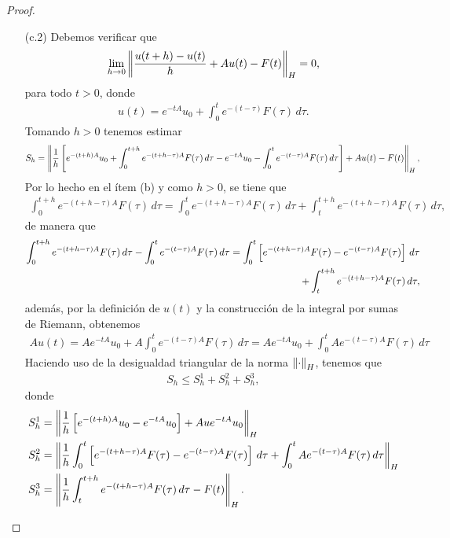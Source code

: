 \begin{proof}
\begin{enumerate}
    \item[(c.2)] Debemos verificar que
    \begin{align*}
        \lim_{h\to 0}\left\|\dfrac{u(t+h)-u(t)}{h}+Au(t)-F(t)\right\|_H=0,
    \end{align*}
    para todo $t>0$, donde
    \begin{align*}
        u(t)=e^{-tA}u_0+\int_0^t e^{-(t-\tau)}F(\tau)\, d\tau.
    \end{align*}
    Tomando $h>0$ tenemos estimar
    \begin{align*}
        S_h=\left\|\frac{1}{h}\left[e^{-(t+h)A}u_0+\int_0^{t+h}e^{-(t+h-\tau)A}F(\tau)\, d\tau-e^{-tA}u_0-\int_0^t e^{-(t-\tau)A}F(\tau)\, d\tau\right]+Au(t)-F(t)\right\|_H,
    \end{align*}
    Por lo hecho en el ítem (b) y como $h>0$, se tiene que 
    \begin{align*}
        \int_{0}^{t+h}e^{-(t+h-\tau)A}F(\tau)\, d\tau=\int_{0}^{t}e^{-(t+h-\tau)A}F(\tau)\, d\tau+\int_{t}^{t+h}e^{-(t+h-\tau)A}F(\tau)\, d\tau,
    \end{align*}
    de manera que
    \begin{align*}
        \int_{0}^{t+h}e^{-(t+h-\tau)A}F(\tau)\, d\tau-\int_0^t e^{-(t-\tau)A}F(\tau)\, d\tau=\int_{0}^{t}\left[e^{-(t+h-\tau)A}F(\tau)-e^{-(t-\tau)A}F(\tau)\right]\, d\tau\\
        \hspace{25mm}+\int_{t}^{t+h}e^{-(t+h-\tau)A}F(\tau)\, d\tau,
    \end{align*}
    además, por la definición de $u(t)$ y la construcción de la integral por sumas de Riemann, obtenemos
    \begin{align*}
        Au(t)=Ae^{-tA}u_0+A\int_0^t e^{-(t-\tau)A}F(\tau)\, d\tau=Ae^{-tA}u_0+\int_0^t Ae^{-(t-\tau)A}F(\tau)\, d\tau
    \end{align*}
    Haciendo uso de la desigualdad triangular de la norma $\left\|\cdot\right\|_H$, tenemos que 
    \begin{align*}
        S_h\leq S_h^1+S_h^2+S_h^3,
    \end{align*}
    donde
    \begin{align*}
        S_h^1&=\norm{\dfrac{1}{h}\left[e^{-(t+h)A}u_0-e^{-tA}u_0\right]+Aue^{-tA}u_0}_H\\
        S_h^2&=\norm{\dfrac{1}{h}\int_{0}^{t}\left[e^{-(t+h-\tau)A}F(\tau)-e^{-(t-\tau)A}F(\tau)\right]\, d\tau+\int_0^t Ae^{-(t-\tau)A}F(\tau)\, d\tau}_H\\
        S_h^3&=\norm{\dfrac{1}{h}\int_{t}^{t+h}e^{-(t+h-\tau)A}F(\tau)\, d\tau-F(t)}_H.

\end{align*}
\end{enumerate}
\end{proof}
